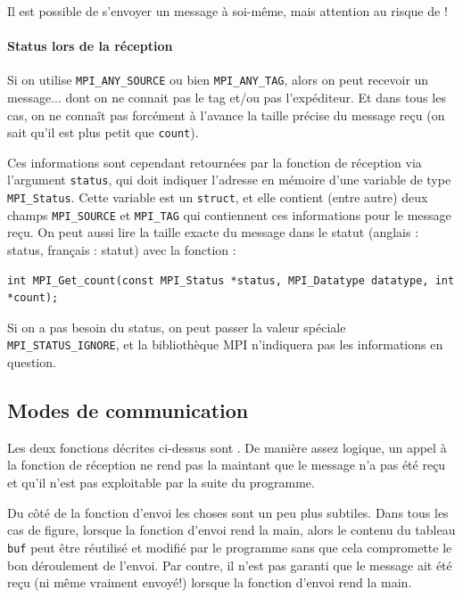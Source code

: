 Il est possible de s'envoyer un message à soi-même, mais attention au
risque de  !

\paragraph{Status lors de la réception} Si on utilise \texttt{MPI\_ANY\_SOURCE}
ou bien \texttt{MPI\_ANY\_TAG}, alors on peut recevoir un message... dont on ne
connait pas le tag et/ou pas l'expéditeur. Et dans tous les cas, on ne connaît
pas forcément à l'avance la taille précise du message reçu (on sait qu'il est
plus petit que \verb|count|).

Ces informations sont cependant retournées par la fonction de réception via
l'argument \texttt{status}, qui doit indiquer l'adresse en mémoire d'une
variable de type \texttt{MPI\_Status}. Cette variable est un \texttt{struct}, et
elle contient (entre autre) deux champs \texttt{MPI\_SOURCE} et
\texttt{MPI\_TAG} qui contiennent ces informations pour le message reçu. On peut
aussi lire la taille exacte du message dans le statut (anglais : \og status\fg,
français : \og statut\fg) avec la fonction :

\begin{verbatim}
int MPI_Get_count(const MPI_Status *status, MPI_Datatype datatype, int *count);
\end{verbatim}

Si on a pas besoin du status, on peut passer la valeur spéciale
\texttt{MPI\_STATUS\_IGNORE}, et la bibliothèque MPI n'indiquera pas les
informations en question.

\subsection{Modes de communication}

Les deux fonctions décrites ci-dessus sont . De
manière assez logique, un appel à la fonction de réception ne \og rend
pas la main\fg tant que le message n'a pas été reçu et qu'il n'est pas
exploitable par la suite du programme.

Du côté de la fonction d'envoi les choses sont un peu plus subtiles. Dans tous
les cas de figure, lorsque la fonction d'envoi rend la main, alors le contenu du
tableau \verb|buf| peut être réutilisé et modifié par le programme sans que cela
compromette le bon déroulement de l'envoi. Par contre, il n'est pas garanti que
le message ait été reçu (ni même \og vraiment envoyé\fg !) lorsque la fonction
d'envoi rend la main.

